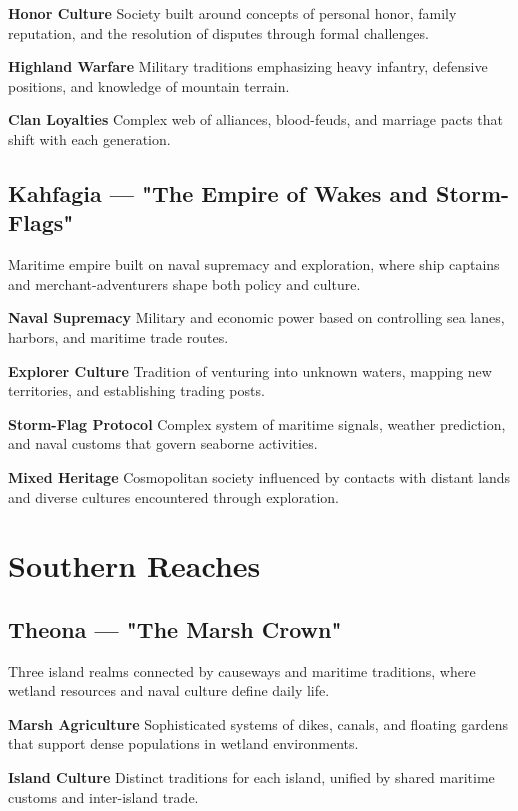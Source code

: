 \documentclass[11pt,twoside,openany]{book}
\begin{document}
\textbf{Honor Culture} Society built around concepts of personal honor, family reputation, and the resolution of disputes through formal challenges.

\textbf{Highland Warfare} Military traditions emphasizing heavy infantry, defensive positions, and knowledge of mountain terrain.

\textbf{Clan Loyalties} Complex web of alliances, blood-feuds, and marriage pacts that shift with each generation.

\subsection*{Kahfagia — "The Empire of Wakes and Storm-Flags"}

Maritime empire built on naval supremacy and exploration, where ship captains and merchant-adventurers shape both policy and culture.

\textbf{Naval Supremacy} Military and economic power based on controlling sea lanes, harbors, and maritime trade routes.

\textbf{Explorer Culture} Tradition of venturing into unknown waters, mapping new territories, and establishing trading posts.

\textbf{Storm-Flag Protocol} Complex system of maritime signals, weather prediction, and naval customs that govern seaborne activities.

\textbf{Mixed Heritage} Cosmopolitan society influenced by contacts with distant lands and diverse cultures encountered through exploration.

\section*{Southern Reaches} 

\subsection*{Theona — "The Marsh Crown"}

Three island realms connected by causeways and maritime traditions, where wetland resources and naval culture define daily life.

\textbf{Marsh Agriculture} Sophisticated systems of dikes, canals, and floating gardens that support dense populations in wetland environments.

\textbf{Island Culture} Distinct traditions for each island, unified by shared maritime customs and inter-island trade.
\end{document}
